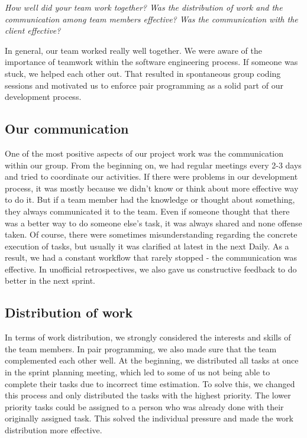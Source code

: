 \emph{How well did your team work together?
Was the distribution of work and the communication among team members effective?
Was the communication with the client effective?}

In general, our team worked really well together.
We were aware of the importance of teamwork within the software engineering process.
If someone was stuck, we helped each other out.
That resulted in spontaneous group coding sessions and motivated us to enforce pair programming as a solid part of our development process.

\subsection{Our communication}
One of the most positive aspects of our project work was the communication within our group.
From the beginning on, we had regular meetings every 2-3 days and tried to coordinate our activities.
If there were problems in our development process, it was mostly because we didn't know or think about more effective way to do it.
But if a team member had the knowledge or thought about something, they always communicated it to the team.
Even if someone thought that there was a better way to do someone else's task, it was always shared and none offense taken.
Of course, there were sometimes misunderstanding regarding the concrete execution of tasks, but usually it was clarified at latest in the next Daily.
As a result, we had a constant workflow that rarely stopped - the communication was effective.
In unofficial retrospectives, we also gave us constructive feedback to do better in the next sprint.

\subsection{Distribution of work}
In terms of work distribution, we strongly considered the interests and skills of the team members.
In pair programming, we also made sure that the team complemented each other well.
At the beginning, we distributed all tasks at once in the sprint planning meeting, which led to some of us not being able to complete their tasks due to incorrect time estimation.
To solve this, we changed this process and only distributed the tasks with the highest priority.
The lower priority tasks could be assigned to a person who was already done with their originally assigned task.
This solved the individual pressure  and made the work distribution more effective.

